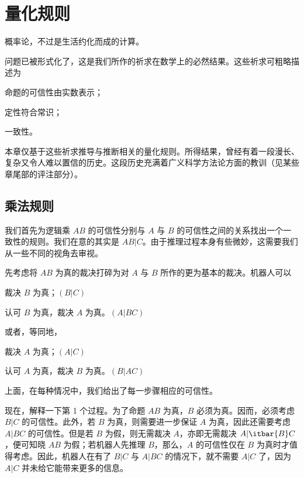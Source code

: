 \chapter[quantitative-rules]{量化规则}

\startdictum
概率论，不过是生活约化而成的计算。
  
\stopdictum

\indentation 问题已被形式化了，这是我们所作的祈求在数学上的必然结果。这些祈求可粗略描述为

\startitemize[R]
\item 命题的可信性由实数表示；
\item 定性符合常识；
\item 一致性。
\stopitemize

\noindent 本章仅基于这些祈求推导与推断相关的量化规则。所得结果，曾经有着一段漫长、复杂又令人难以置信的历史。这段历史充满着广义科学方法论方面的教训（见某些章尾部的评注部分）。

\section{乘法规则}

我们首先为逻辑乘 $AB$ 的可信性分别与 $A$ 与 $B$ 的可信性之间的关系找出一个一致性的规则。我们在意的其实是 $AB|C$。由于推理过程本身有些微妙，这需要我们从一些不同的视角去审视。

先考虑将 $AB$ 为真的裁决打碎为对 $A$ 与 $B$ 所作的更为基本的裁决。机器人可以

\startitemize[n]
\item 裁决 $B$ 为真；\hfill $(B|C)$
\item 认可 $B$ 为真，裁决 $A$ 为真。\hfill $(A|BC)$
\stopitemize

\noindent 或者，等同地，

\startitemize[n]
\item 裁决 $A$ 为真；\hfill $(A|C)$
\item 认可 $A$ 为真，裁决 $B$ 为真。\hfill $(B|AC)$
\stopitemize

\noindent 上面，在每种情况中，我们给出了每一步骤相应的可信性。

现在，解释一下第 1 个过程。为了命题 $AB$ 为真，$B$ 必须为真。因而，必须考虑 $B|C$ 的可信性。此外，若 $B$ 为真，则需要进一步保证 $A$ 为真，因此还需要考虑 $A|BC$ 的可信性。但是若 $B$ 为假，则无需裁决 $A$，亦即无需裁决 $A|\itbar{B}C$，便可知晓 $AB$ 为假；若机器人先推理 $B$，那么，$A$ 的可信性仅在 $B$ 为真时才值得考虑。因此，机器人在有了 $B|C$ 与 $A|BC$ 的情况下，就不需要 $A|C$ 了，因为 $A|C$ 并未给它能带来更多的信息。

